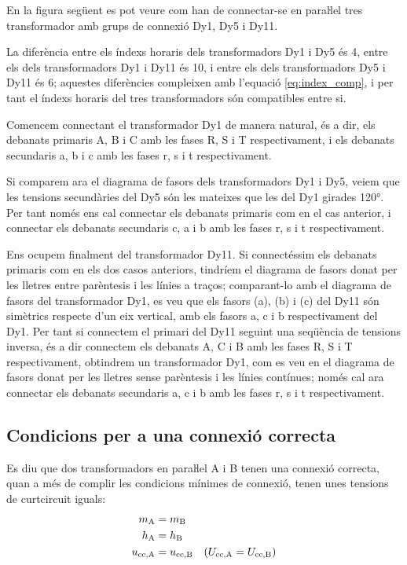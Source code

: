 \begin{exemple}
    En la figura següent es pot veure com han de connectar-se en paraŀlel tres transformador amb grups de connexió Dy1, Dy5 i Dy11.
    \begin{center}
        
    \end{center}

    La diferència entre els índexs horaris dels transformadors Dy1 i Dy5 és 4, entre els dels transformadors Dy1 i Dy11 és 10, i entre els dels transformadors Dy5 i Dy11 és 6; aquestes diferències compleixen amb l'equació \eqref{eq:index_comp}, i per tant el índexs horaris del tres transformadors són compatibles entre si.


    Comencem connectant el  transformador Dy1 de manera natural, és a dir, els debanats primaris A, B i C amb les fases R, S i T respectivament, i els debanats secundaris a, b i c amb les fases r, s i t respectivament.

    Si comparem ara el diagrama de fasors dels transformadors Dy1 i Dy5, veiem que les tensions secundàries del Dy5 són les mateixes que les del Dy1 girades \ang{120}. Per tant només ens cal connectar els debanats primaris com en el cas anterior, i connectar els debanats secundaris c, a i b amb les fases r, s i t respectivament.

    Ens ocupem finalment del transformador Dy11. Si connectéssim els debanats primaris com en els dos casos anteriors, tindríem el diagrama de fasors donat per les lletres entre parèntesis i les línies a traços; comparant-lo amb el diagrama de fasors del transformador Dy1, es veu que els fasors (a), (b) i (c) del Dy11 són simètrics respecte d'un eix vertical, amb els fasors a, c i b respectivament del Dy1. Per tant si connectem el primari del Dy11 seguint una seqüència de tensions inversa, és a dir connectem els debanats A, C i B amb les fases R, S i T respectivament, obtindrem un transformador Dy1, com es veu en el diagrama de fasors donat per les lletres sense parèntesis i les línies contínues; només cal ara connectar els debanats secundaris a, c i b amb les fases r, s i t respectivament.
\end{exemple}

\subsection{Condicions per a una connexió correcta}
 Es diu que dos transformadors en paraŀlel  A i B tenen una connexió correcta, quan a més de complir les condicions mínimes de connexió, tenen unes tensions de curtcircuit iguals:
\begin{align}
    m_\mathrm{A} &= m_\mathrm{B}\\
    h_\mathrm{A} &= h_\mathrm{B}\\
    u_\mathrm{cc,A} &= u_\mathrm{cc,B} \quad (U_\mathrm{cc,A} = U_\mathrm{cc,B})
\end{align}

